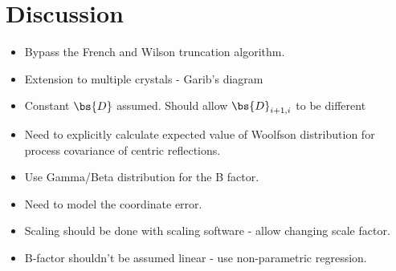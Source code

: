 \section{Discussion}
\label{sec:Discussion - Data Reduction}
\begin{itemize}
    \item Bypass the French and Wilson truncation algorithm.
    \item Extension to multiple crystals - Garib's diagram
    \item Constant $\bs{D}$ assumed. Should allow $\bs{D}_{i+1, i}$ to be different
    \item Need to explicitly calculate expected value of Woolfson distribution for process covariance of centric reflections.
    \item Use Gamma/Beta distribution for the B factor.
    \item Need to model the coordinate error.
    \item Scaling should be done with scaling software - allow changing scale factor.
    \item B-factor shouldn't be assumed linear - use non-parametric regression.
\end{itemize}
